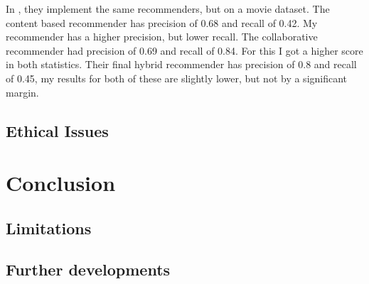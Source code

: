 \documentclass[conference]{IEEEtran}
\begin{document}
In \cite{evaluation}, they implement the same recommenders, but on a movie dataset. The content based recommender has precision of 0.68 and recall of 0.42. My recommender has a higher precision, but lower recall. The collaborative recommender had precision of 0.69 and recall of 0.84. For this I got a higher score in both statistics. Their final hybrid recommender has precision of 0.8 and recall of 0.45, my results for both of these are slightly lower, but not by a significant margin.

\subsection{Ethical Issues}

\section{Conclusion}

\subsection{Limitations}

\subsection{Further developments}




\end{document}
